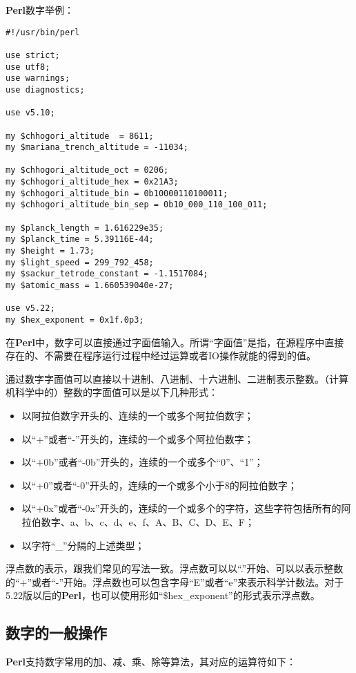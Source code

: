 \documentclass[11pt]{book}
\newcommand{\programminglanguage}[1]{\textbf{#1}}
\begin{document}
			\programminglanguage{Perl}数字举例：
\lstset{language=Perl} 
\begin{lstlisting}
#!/usr/bin/perl

use strict;
use utf8;
use warnings;
use diagnostics;

use v5.10;

my $chhogori_altitude  = 8611;
my $mariana_trench_altitude = -11034;

my $chhogori_altitude_oct = 0206;
my $chhogori_altitude_hex = 0x21A3;
my $chhogori_altitude_bin = 0b10000110100011;
my $chhogori_altitude_bin_sep = 0b10_000_110_100_011;

my $planck_length = 1.616229e35;
my $planck_time = 5.39116E-44;
my $height = 1.73;
my $light_speed = 299_792_458;
my $sackur_tetrode_constant = -1.1517084;
my $atomic_mass = 1.660539040e-27;

use v5.22;
my $hex_exponent = 0x1f.0p3;
\end{lstlisting}

			在\programminglanguage{Perl}中，数字可以直接通过字面值输入。所谓“字面值”是指，在源程序中直接存在的、不需要在程序运行过程中经过运算或者IO操作就能的得到的值。
			
			通过数字字面值可以直接以十进制、八进制、十六进制、二进制表示整数。（计算机科学中的）整数的字面值可以是以下几种形式：
			\begin{itemize}
				\item 以阿拉伯数字开头的、连续的一个或多个阿拉伯数字；
				\item 以“+”或者“-”开头的，连续的一个或多个阿拉伯数字；
				\item 以“+0b”或者“-0b”开头的，连续的一个或多个“0”、“1”；
				\item 以“+0”或者“-0”开头的，连续的一个或多个小于8的阿拉伯数字；
				\item 以“+0x”或者“-0x”开头的，连续的一个或多个的字符，这些字符包括所有的阿拉伯数字、a、b、c、d、e、f、A、B、C、D、E、F；
				\item 以字符“\_”分隔的上述类型；
			\end{itemize}
			
			浮点数的表示，跟我们常见的写法一致。浮点数可以以“.”开始、可以以表示整数的“+”或者“-”开始。浮点数也可以包含字母“E”或者“e”来表示科学计数法。对于5.22版以后的\programminglanguage{Perl}，也可以使用形如“\$hex\_exponent”的形式表示浮点数。
			
			\subsection{数字的一般操作}
			\programminglanguage{Perl}支持数字常用的加、减、乘、除等算法，其对应的运算符如下：
			
\end{document}
